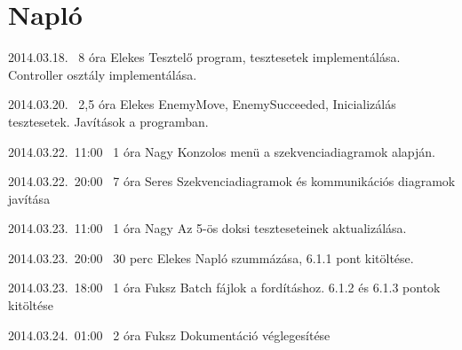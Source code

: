 %
\section{Napló}

\begin{naplo}


\bejegyzes
{2014.03.18.~}
{8 óra}
{Elekes}
{Tesztelő program, tesztesetek implementálása.\newline
Controller osztály implementálása.}

\bejegyzes
{2014.03.20.~}
{2,5 óra}
{Elekes}
{EnemyMove, EnemySucceeded, Inicializálás tesztesetek. Javítások a programban.}

\bejegyzes
{2014.03.22.~11:00~}
{1 óra}
{Nagy}
{Konzolos menü a szekvenciadiagramok alapján.}

\bejegyzes
{2014.03.22.~20:00~}
{7 óra}
{Seres}
{Szekvenciadiagramok és kommunikációs diagramok javítása}

\bejegyzes
{2014.03.23.~11:00~}
{1 óra}
{Nagy}
{Az 5-ös doksi teszteseteinek aktualizálása.}

\bejegyzes
{2014.03.23.~20:00~}
{30 perc }
{Elekes}
{Napló szummázása, 6.1.1 pont kitöltése.}

\bejegyzes
{2014.03.23.~18:00~}
{1 óra}
{Fuksz}
{Batch fájlok a fordításhoz. 6.1.2 és 6.1.3 pontok kitöltése}

\bejegyzes
{2014.03.24.~01:00~}
{2 óra}
{Fuksz}
{Dokumentáció véglegesítése}



\end{naplo}

